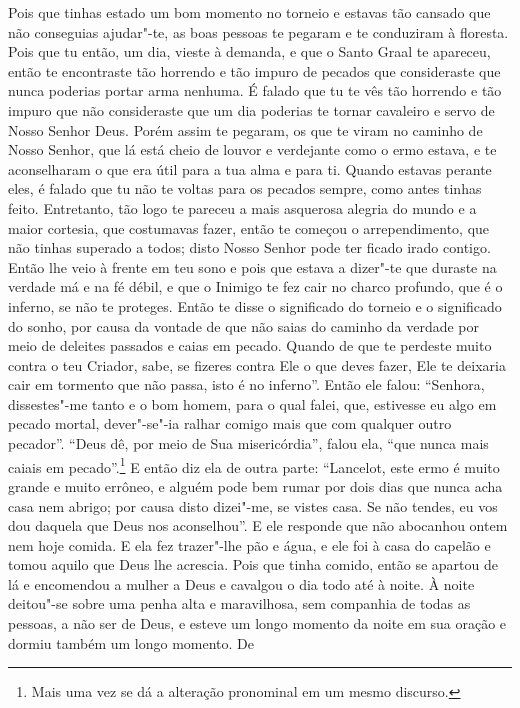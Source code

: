 Pois que tinhas estado um bom momento no torneio e estavas tão cansado que não
conseguias ajudar"-te, as boas pessoas te pegaram e te conduziram à floresta.
Pois que tu então, um dia, vieste à demanda, e que o Santo Graal te apareceu,
então te encontraste tão horrendo e tão impuro de pecados que consideraste que
nunca poderias portar arma nenhuma. É falado que tu te vês tão horrendo e tão
impuro que não consideraste que um dia poderias te tornar cavaleiro e servo de
Nosso Senhor Deus. Porém assim te pegaram, os que te viram no caminho de Nosso
Senhor, que lá está cheio de louvor e verdejante como o ermo estava, e te
aconselharam o que era útil para a tua alma e para ti. Quando estavas perante
eles, é falado que tu não te voltas para os pecados sempre, como antes tinhas
feito. Entretanto, tão logo te pareceu a mais asquerosa alegria do mundo e a
maior cortesia, que costumavas fazer, então te começou o arrependimento, que
não tinhas superado a todos; disto Nosso Senhor pode ter ficado irado contigo.
Então lhe veio à frente em teu sono e pois que estava a dizer"-te que duraste na
verdade má e na fé débil, e que o Inimigo te fez cair no charco profundo, que é
o inferno, se não te proteges. Então te disse o significado do torneio e o
significado do sonho, por causa da vontade de que não saias do caminho da
verdade por meio de deleites passados e caias em pecado. Quando de que te
perdeste muito contra o teu Criador, sabe, se fizeres contra Ele o que deves
fazer, Ele te deixaria cair em tormento que não passa, isto é no inferno”. 
Então ele falou: “Senhora, dissestes"-me tanto e o bom homem, para o
qual falei, que, estivesse eu algo em pecado mortal, dever"-se"-ia ralhar comigo
mais que com qualquer outro pecador”. “Deus dê, por meio de Sua misericórdia”,
falou ela, “que nunca mais caiais em pecado”.\footnote{ Mais uma vez se dá a
alteração pronominal em um mesmo discurso.} E então diz ela
de outra parte: “Lancelot, este ermo é muito grande e muito errôneo, e alguém
pode bem rumar por dois dias que nunca acha casa nem abrigo; por causa disto
dizei"-me, se vistes casa. Se não tendes, eu vos dou daquela que Deus nos
aconselhou”. E ele responde que não abocanhou ontem nem hoje comida. E ela fez
trazer"-lhe pão e água, e ele foi à casa do capelão e tomou aquilo que Deus lhe
acrescia. Pois que tinha comido, então se apartou de lá e encomendou a mulher a
Deus e cavalgou o dia todo até à noite. À noite deitou"-se sobre uma penha alta
e maravilhosa, sem companhia de todas as pessoas, a não ser de Deus, e esteve
um longo momento da noite em sua oração e dormiu também um longo momento. De
